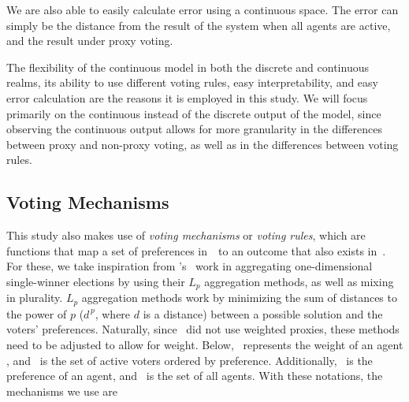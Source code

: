 We are also able to easily calculate error using a continuous space.
The error can simply be the distance from the result of the system when all agents
are active, and the result under proxy voting.

The flexibility of the continuous model in both the discrete and continuous realms, its
ability to use different voting rules, easy interpretability, and easy error
calculation are the reasons it is employed in this study.
We will focus primarily on the continuous instead of the discrete output of the
model, since observing the continuous output allows for more granularity in the
differences between proxy and non-proxy voting, as well as in the differences between
voting rules.

\subsection{Voting Mechanisms}\label{subsec:voting-mechanisms}
This study also makes use of \textit{voting mechanisms} or \textit{voting rules},
which are functions that map a set of preferences in~\systemspace\ to an outcome that
also exists in~\systemspace.
For these, we take inspiration from 's~\cite{Bulteau2021} work in
aggregating one-dimensional single-winner elections by using their $L_p$ aggregation
methods, as well as mixing in plurality.
$L_p$ aggregation methods work by minimizing the sum of distances to the power of $p$
($d^{\,p}$, where $d$ is a distance) between a possible solution and the voters'
preferences.
Naturally, since~\cite{Bulteau2021} did not use weighted proxies, these methods need
to be adjusted to allow for weight.
Below, \agentweight\ represents the weight of an agent \agent, and \systemproxies\ is
the set of active voters ordered by preference.
Additionally, \agenttruth\ is the preference of an agent, and \system\ is the set of
all agents.
With these notations, the mechanisms we use are
